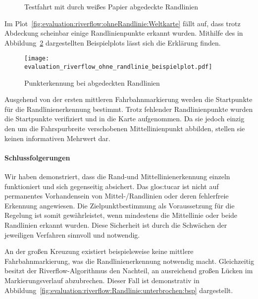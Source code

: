 \begin{figure}[htbp] %
	\hfill
	\caption{Testfahrt mit durch weißes Papier abgedeckte Randlinien}
	\label{fig:evaluation:riverflow:ohneRandlinie}
\end{figure}

Im Plot~\ref{fig:evaluation:riverflow:ohneRandlinie:Weltkarte} fällt auf, dass trotz Abdeckung scheinbar einige Randlinienpunkte erkannt wurden. Mithilfe des in Abbildung~\ref{fig:evaluation:riverflow:ohneMittellinie:bspPlot} dargestellten Beispielplots lässt sich die Erklärung finden.

\begin{figure}[htbp] %
	\centering
	\texttt{[image: evaluation\_riverflow\_ohne\_randlinie\_beispielplot.pdf]}
	\caption{Punkterkennung bei abgedeckten Randlinien}
	\label{fig:evaluation:riverflow:ohneMittellinie:bspPlot}
\end{figure}

Ausgehend von der ersten mittleren Fahrbahnmarkierung werden die Startpunkte für die Randlinienerkennung bestimmt. Trotz fehlender Randlinienpunkte wurden die Startpunkte verifiziert und in die Karte aufgenommen. Da sie jedoch einzig den um die Fahrspurbreite verschobenen Mittellinienpunkt abbilden, stellen sie keinen informativen Mehrwert dar.

\paragraph{Schlussfolgerungen}

Wir haben demonstriert, dass die Rand-und Mittellinienerkennung einzeln funktioniert und sich gegenseitig absichert. Das \gls{glos:tucar} ist nicht auf permanentes Vorhandensein von Mittel-/Randlinien oder deren fehlerfreie Erkennung angewiesen.
Die Zielpunktbestimmung als Voraussetzung für die Regelung ist somit gewährleistet, wenn mindestens die Mittellinie oder beide Randlinien erkannt wurden. Diese Sicherheit ist durch die Schwächen der jeweiligen Verfahren sinnvoll und notwendig. 

An der großen Kreuzung existiert beispielsweise keine mittlere Fahrbahnmarkierung, was die Randlinienerkennung notwendig macht. Gleichzeitig besitzt der Riverflow-Algorithmus den Nachteil, an ausreichend großen Lücken im Markierungsverlauf abzubrechen. Dieser Fall ist demonstrativ in Abbildung~\ref{fig:evaluation:riverflow:Randlinie:unterbrochen:bsp} dargestellt. 


